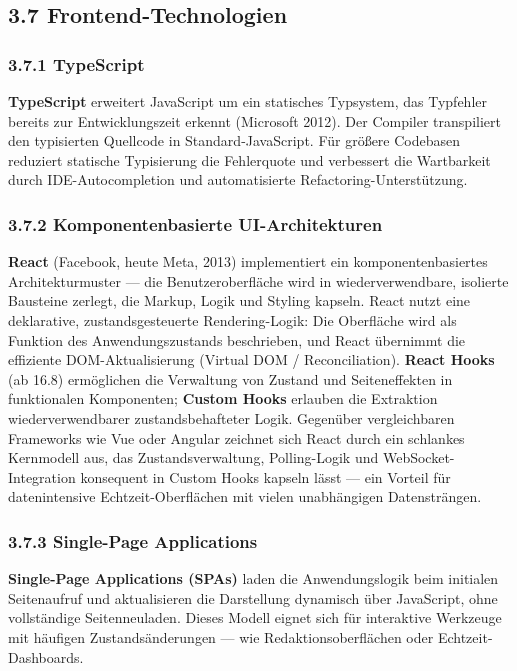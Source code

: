\subsection{3.7 Frontend-Technologien}\label{frontend-technologien}

\subsubsection{3.7.1 TypeScript}\label{typescript}

\textbf{TypeScript} erweitert JavaScript um ein statisches Typsystem,
das Typfehler bereits zur Entwicklungszeit erkennt (Microsoft 2012). Der
Compiler transpiliert den typisierten Quellcode in Standard-JavaScript.
Für größere Codebasen reduziert statische Typisierung die Fehlerquote
und verbessert die Wartbarkeit durch IDE-Autocompletion und
automatisierte Refactoring-Unterstützung.

\subsubsection{3.7.2 Komponentenbasierte
UI-Architekturen}\label{komponentenbasierte-ui-architekturen}

\textbf{React} (Facebook, heute Meta, 2013) implementiert ein
komponentenbasiertes Architekturmuster --- die Benutzeroberfläche wird
in wiederverwendbare, isolierte Bausteine zerlegt, die Markup, Logik und
Styling kapseln. React nutzt eine deklarative, zustandsgesteuerte
Rendering-Logik: Die Oberfläche wird als Funktion des Anwendungszustands
beschrieben, und React übernimmt die effiziente DOM-Aktualisierung
(Virtual DOM / Reconciliation). \textbf{React Hooks} (ab 16.8)
ermöglichen die Verwaltung von Zustand und Seiteneffekten in
funktionalen Komponenten; \textbf{Custom Hooks} erlauben die Extraktion
wiederverwendbarer zustandsbehafteter Logik. Gegenüber vergleichbaren
Frameworks wie Vue oder Angular zeichnet sich React durch ein schlankes
Kernmodell aus, das Zustandsverwaltung, Polling-Logik und
WebSocket-Integration konsequent in Custom Hooks kapseln lässt --- ein
Vorteil für datenintensive Echtzeit-Oberflächen mit vielen unabhängigen
Datensträngen.

\subsubsection{3.7.3 Single-Page
Applications}\label{single-page-applications}

\textbf{Single-Page Applications (SPAs)} laden die Anwendungslogik beim
initialen Seitenaufruf und aktualisieren die Darstellung dynamisch über
JavaScript, ohne vollständige Seitenneuladen. Dieses Modell eignet sich
für interaktive Werkzeuge mit häufigen Zustandsänderungen --- wie
Redaktionsoberflächen oder Echtzeit-Dashboards.

